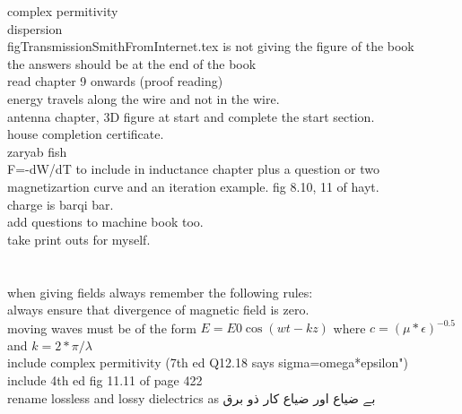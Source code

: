\begin{otherlanguage}{english}
complex permitivity\\
dispersion\\
figTransmissionSmithFromInternet.tex is not giving the figure of the book\\
the answers should be at the end of the book\\
read chapter 9 onwards (proof reading)\\
energy travels along the wire and not in the wire.\\
antenna chapter, 3D figure at start and complete the start section.\\
house completion certificate.\\
zaryab fish\\
F=-dW/dT to include in inductance chapter plus a question or two\\
magnetizartion curve and an iteration example. fig 8.10, 11 of hayt.\\
charge is barqi bar.\\
add questions to machine book too.\\
take print outs for myself.\\
\\
\\
when giving fields always remember the following rules:\\
always ensure that divergence of magnetic field is zero.\\
moving waves must be of the form $E=E0 \cos(wt-kz)$ where $c=(\mu*\epsilon)^{-0.5}$ and $k=2*\pi/\lambda$\\
include complex permitivity  (7th ed Q12.18 says sigma=omega*epsilon")\\
include 4th ed fig 11.11 of page 422\\
rename lossless and lossy dielectrics as بے ضیاع اور ضیاع کار ذو برق
\end{otherlanguage}
